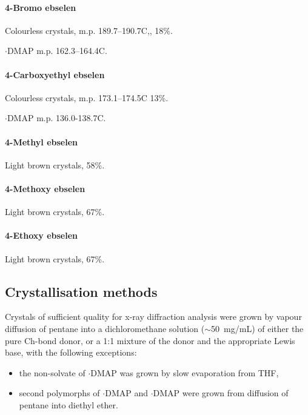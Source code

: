 \begin{refsection}
\paragraph{4-Bromo ebselen }
Colourless crystals, m.p. 189.7--190.7\degree C,, 18\%.

$\cdot$DMAP m.p. 162.3--164.4\degree C.

\paragraph{4-Carboxyethyl ebselen }
Colourless crystals, m.p. 173.1--174.5\degree C 13\%.

$\cdot$DMAP m.p. 136.0-138.7\degree C.

\paragraph{4-Methyl ebselen }
Light brown crystals, 58\%.

\paragraph{4-Methoxy ebselen }
Light brown crystals, 67\%.

\paragraph{4-Ethoxy ebselen }
Light brown crystals, 67\%.

\normalsize

\subsection{Crystallisation methods}
Crystals of sufficient quality for x-ray diffraction analysis were grown by vapour diffusion of pentane into a dichloromethane solution ($\sim$50~mg/mL) of either the pure Ch-bond donor, or a 1:1 mixture of the donor and the appropriate Lewis base, with the following exceptions:
\begin{itemize}
    \item the non-solvate of $\cdot$DMAP was grown by slow evaporation from THF,
    \item second polymorphs of $\cdot$DMAP and $\cdot$DMAP were grown from diffusion of pentane into diethyl ether.
\end{itemize}

\printbibliography[heading=subbibliography]
\end{refsection}